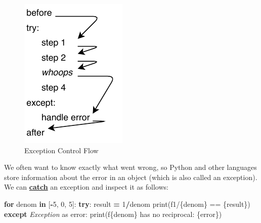 \documentclass[
]{krantz}
\makeatletter
\newenvironment{Shaded}{\begin{snugshade}}{\end{snugshade}}
\newcommand{\BuiltInTok}[1]{#1}
\newcommand{\ControlFlowTok}[1]{\textcolor[rgb]{0.13,0.29,0.53}{\textbf{#1}}}
\newcommand{\DecValTok}[1]{\textcolor[rgb]{0.00,0.00,0.81}{#1}}
\newcommand{\ImportTok}[1]{#1}
\newcommand{\KeywordTok}[1]{\textcolor[rgb]{0.13,0.29,0.53}{\textbf{#1}}}
\newcommand{\NormalTok}[1]{#1}
\newcommand{\OperatorTok}[1]{\textcolor[rgb]{0.81,0.36,0.00}{\textbf{#1}}}
\newcommand{\PreprocessorTok}[1]{\textcolor[rgb]{0.56,0.35,0.01}{\textit{#1}}}
\newcommand{\SpecialCharTok}[1]{\textcolor[rgb]{0.00,0.00,0.00}{#1}}
\newcommand{\SpecialStringTok}[1]{\textcolor[rgb]{0.31,0.60,0.02}{#1}}
\newenvironment{kframe}{%
\medskip{}
\setlength{\fboxsep}{.8em}
 \def\at@end@of@kframe{}%
 \ifinner\ifhmode%
  \def\at@end@of@kframe{\end{minipage}}%
  \begin{minipage}{\columnwidth}%
 \fi\fi%
 \def\FrameCommand##1{\hskip\@totalleftmargin \hskip-\fboxsep
 \colorbox{shadecolor}{##1}\hskip-\fboxsep
     \hskip-\linewidth \hskip-\@totalleftmargin \hskip\columnwidth}%
 \MakeFramed {\advance\hsize-\width
   \@totalleftmargin\z@ \linewidth\hsize
   \@setminipage}}%
 {\par\unskip\endMakeFramed%
 \at@end@of@kframe}
\renewenvironment{Shaded}{\begin{kframe}}{\end{kframe}}
\newcommand{\gref}[2]{\hyperlink{#2}{\textbf{#1}}}
\makeatother
\begin{document}
\begin{figure}

{\centering \includegraphics[width=0.4\linewidth]{figures/errors/exceptions} 

}

\caption{Exception Control Flow}\label{fig:errors-control-flow}
\end{figure}

We often want to know exactly what went wrong,
so Python and other languages store information about the error
in an object (which is also called an exception).
We can \gref{catch}{catch\_exception} an exception and inspect it as follows:

\begin{Shaded}
\begin{Highlighting}[]
\ControlFlowTok{for}\NormalTok{ denom }\KeywordTok{in}\NormalTok{ [}\OperatorTok{{-}}\DecValTok{5}\NormalTok{, }\DecValTok{0}\NormalTok{, }\DecValTok{5}\NormalTok{]:}
    \ControlFlowTok{try}\NormalTok{:}
\NormalTok{        result }\OperatorTok{=} \DecValTok{1}\OperatorTok{/}\NormalTok{denom}
        \BuiltInTok{print}\NormalTok{(}\SpecialStringTok{f\textquotesingle{}1/}\SpecialCharTok{\{}\NormalTok{denom}\SpecialCharTok{\}}\SpecialStringTok{ == }\SpecialCharTok{\{}\NormalTok{result}\SpecialCharTok{\}}\SpecialStringTok{\textquotesingle{}}\NormalTok{)}
    \ControlFlowTok{except} \PreprocessorTok{Exception} \ImportTok{as}\NormalTok{ error:}
        \BuiltInTok{print}\NormalTok{(}\SpecialStringTok{f\textquotesingle{}}\SpecialCharTok{\{}\NormalTok{denom}\SpecialCharTok{\}}\SpecialStringTok{ has no reciprocal: }\SpecialCharTok{\{}\NormalTok{error}\SpecialCharTok{\}}\SpecialStringTok{\textquotesingle{}}\NormalTok{)}
\end{Highlighting}
\end{Shaded}
\end{document}
